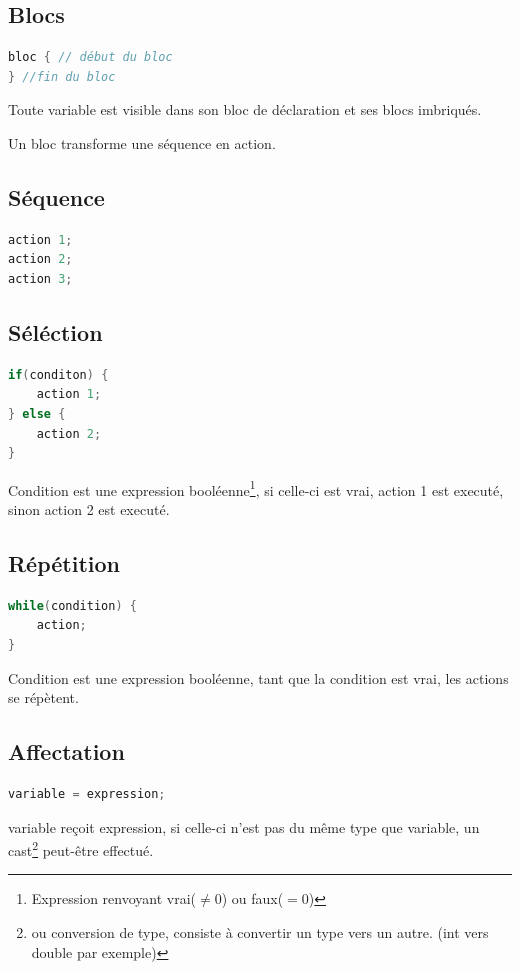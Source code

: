 \documentclass[12pt,a4paper,openany]{book}
\begin{document}
	\subsection{Blocs}
\begin{lstlisting}[language=C, caption=Syntaxe d'un bloc]
bloc { // début du bloc
} //fin du bloc
\end{lstlisting}
	Toute variable est visible dans son bloc de déclaration et ses blocs imbriqués.

	Un bloc transforme une séquence en action.

	\subsection{Séquence}
\begin{lstlisting}[language=C, caption=Syntaxe des actions]
action 1;
action 2;
action 3;
\end{lstlisting}
	\subsection{Séléction}
\begin{lstlisting}[language=C, caption=Syntaxe d'une structure de contrôle]
if(conditon) {
	action 1;
} else {
	action 2;
}
\end{lstlisting}
Condition est une expression booléenne\footnote{Expression renvoyant vrai($\neq 0$) ou faux($=0$)}, si celle-ci est vrai, action 1 est executé, sinon action 2 est executé. 

\subsection{Répétition}
\begin{lstlisting}[language=C, caption=Syntaxe de répétition]
while(condition) {
	action;
}
\end{lstlisting}
Condition est une expression booléenne, tant que la condition est vrai, les actions se répètent.

\subsection{Affectation}
\begin{lstlisting}[language=C, caption=Syntaxe d'une affectation ]
variable = expression;
\end{lstlisting}
variable reçoit expression, si celle-ci n'est pas du même type que variable, un cast\footnote{ou conversion de type, consiste à convertir un type vers un autre. (int vers double par exemple)} peut-être effectué.
\newpage
\end{document}
